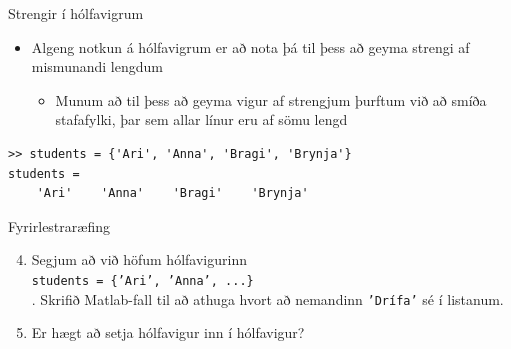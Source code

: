 \documentclass{beamer}
\begin{document}
\begin{frame}[fragile]{Strengir í hólfavigrum}
\begin{itemize}
 \item Algeng notkun á hólfavigrum er að nota þá til þess að geyma strengi af mismunandi lengdum
 \begin{itemize}
  \item Munum að til þess að geyma vigur af strengjum þurftum við að smíða stafafylki, þar sem allar línur eru af sömu lengd
 \end{itemize}
\end{itemize}
\begin{verbatim}
>> students = {'Ari', 'Anna', 'Bragi', 'Brynja'}
students = 
    'Ari'    'Anna'    'Bragi'    'Brynja'
\end{verbatim}
\end{frame}

\begin{frame}{Fyrirlestraræfing}
\begin{enumerate}
 \setcounter{enumi}{3}
 \item Segjum að við höfum hólfavigurinn\\ \texttt{students = \{'Ari', 'Anna', ...\}}
 \\. Skrifið Matlab-fall til að athuga hvort að nemandinn \texttt{'Drífa'} sé í listanum.
 \item Er hægt að setja hólfavigur inn í hólfavigur?
\end{enumerate}
\end{frame}
\end{document}
